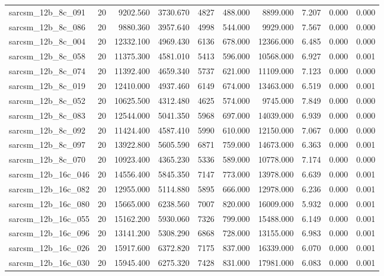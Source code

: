 \begin{tabular}{lrrrrrrrrr}
sarcsm\_12b\_8c\_091 & 20 & 9202.560 & 3730.670 & 4827 & 488.000 & 8899.000 & 7.207 & 0.000 & 0.000 \\
sarcsm\_12b\_8c\_086 & 20 & 9880.360 & 3957.640 & 4998 & 544.000 & 9929.000 & 7.567 & 0.000 & 0.000 \\
sarcsm\_12b\_8c\_004 & 20 & 12332.100 & 4969.430 & 6136 & 678.000 & 12366.000 & 6.485 & 0.000 & 0.000 \\
sarcsm\_12b\_8c\_058 & 20 & 11375.300 & 4581.010 & 5413 & 596.000 & 10568.000 & 6.927 & 0.000 & 0.001 \\
sarcsm\_12b\_8c\_074 & 20 & 11392.400 & 4659.340 & 5737 & 621.000 & 11109.000 & 7.123 & 0.000 & 0.000 \\
sarcsm\_12b\_8c\_019 & 20 & 12410.000 & 4937.460 & 6149 & 674.000 & 13463.000 & 6.519 & 0.000 & 0.001 \\
sarcsm\_12b\_8c\_052 & 20 & 10625.500 & 4312.480 & 4625 & 574.000 & 9745.000 & 7.849 & 0.000 & 0.000 \\
sarcsm\_12b\_8c\_083 & 20 & 12544.000 & 5041.350 & 5968 & 697.000 & 14039.000 & 6.939 & 0.000 & 0.000 \\
sarcsm\_12b\_8c\_092 & 20 & 11424.400 & 4587.410 & 5990 & 610.000 & 12150.000 & 7.067 & 0.000 & 0.000 \\
sarcsm\_12b\_8c\_097 & 20 & 13922.800 & 5605.590 & 6871 & 759.000 & 14673.000 & 6.363 & 0.000 & 0.001 \\
sarcsm\_12b\_8c\_070 & 20 & 10923.400 & 4365.230 & 5336 & 589.000 & 10778.000 & 7.174 & 0.000 & 0.000 \\
sarcsm\_12b\_16c\_046 & 20 & 14556.400 & 5845.350 & 7147 & 773.000 & 13978.000 & 6.639 & 0.000 & 0.001 \\
sarcsm\_12b\_16c\_082 & 20 & 12955.000 & 5114.880 & 5895 & 666.000 & 12978.000 & 6.236 & 0.000 & 0.001 \\
sarcsm\_12b\_16c\_080 & 20 & 15665.000 & 6238.560 & 7007 & 820.000 & 16009.000 & 5.932 & 0.000 & 0.001 \\
sarcsm\_12b\_16c\_055 & 20 & 15162.200 & 5930.060 & 7326 & 799.000 & 15488.000 & 6.149 & 0.000 & 0.001 \\
sarcsm\_12b\_16c\_096 & 20 & 13141.200 & 5308.290 & 6868 & 728.000 & 13155.000 & 6.983 & 0.000 & 0.001 \\
sarcsm\_12b\_16c\_026 & 20 & 15917.600 & 6372.820 & 7175 & 837.000 & 16339.000 & 6.070 & 0.000 & 0.001 \\
sarcsm\_12b\_16c\_030 & 20 & 15945.400 & 6275.320 & 7428 & 831.000 & 17981.000 & 6.083 & 0.000 & 0.001 \\

\end{tabular}
